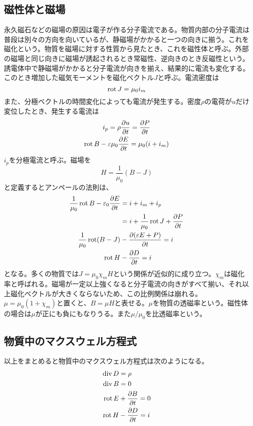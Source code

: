 \subsection{磁性体と磁場}
    永久磁石などの磁場の原因は電子が作る分子電流である。物質内部の分子電流は普段は別々の方向を向いているが、静磁場がかかると一つの向きに揃う。これを磁化という。物質を磁場に対する性質から見たとき、これを磁性体と呼ぶ。外部の磁場と同じ向きに磁場が誘起されるとき常磁性、逆向きのとき反磁性という。誘電体中で静磁場がかかると分子電流が向きを揃え、結果的に電流も変化する。このとき増加した磁気モーメントを磁化ベクトル$J$と呼ぶ。電流密度は
        \[\rot J = \mu_0i_m\]
    また、分極ベクトルの時間変化によっても電流が発生する。密度$\rho$の電荷が$u$だけ変位したとき、発生する電流は
    \begin{gather*}
        i_p = \rho\pd[u]{t} = \pd[P]{t}\\
        \rot B - \epsilon\mu_0\pd[E]{t} = \mu_0 (i + i_m)
    \end{gather*}
    $i_p$を分極電流と呼ぶ。磁場を
        \[H = \frac{1}{\mu_0}(B - J)\]
    と定義するとアンペールの法則は、
    \begin{align*}
        \frac{1}{\mu_0}\rot B - \epsilon_0 \pd[E]{t}
            &= i + i_m + i_p\\
            &= i + \frac{1}{\mu_0}\rot J + \pd[P]{t}\\
        \frac{1}{\mu_0}\rot(B - J) &- \pd[(\epsilon E + P)]{t} = i\\
        \rot H &- \pd[D]{t} = i
    \end{align*}
    となる。多くの物質では$J = \mu_0\chi_m H$という関係が近似的に成り立つ。$\chi_m$は磁化率と呼ばれる。磁場が一定以上強くなると分子電流の向きがすべて揃い、それ以上磁化ベクトルが大きくならないため、この比例関係は崩れる。$\mu = \mu_0(1 + \chi_m)$と置くと、$B = \mu H$と表せる。$\mu$を物質の透磁率という。磁性体の場合は$\mu$が正にも負にもなりうる。また$\mu / \mu_0$を比透磁率という。

\subsection{物質中のマクスウェル方程式}
    以上をまとめると物質中のマクスウェル方程式は次のようになる。
    \begin{align*}
        \div D &= \rho\\
        \div B &= 0\\
        \rot E &+ \pd[B]{t} = 0\\
        \rot H &- \pd[D]{t} =  i
    \end{align*}